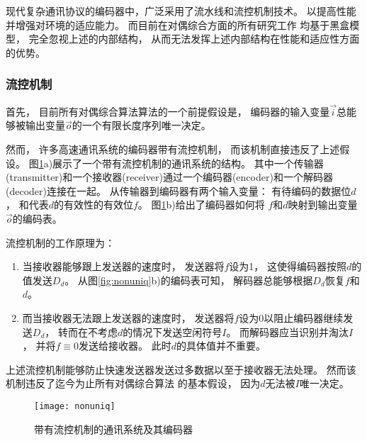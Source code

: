 
现代复杂通讯协议的编码器中，广泛采用了流水线和流控机制技术。
以提高性能并增强对环境的适应能力。
而目前在对偶综合方面的所有研究工作
均基于黑盒模型，
完全忽视上述的内部结构，
从而无法发挥上述内部结构在性能和适应性方面的优势。

\subsubsection{流控机制}
首先，
目前所有对偶综合算法算法的一个前提假设是，
编码器的输入变量$\vec{i}$总能够被输出变量$\vec{o}$的一个有限长度序列唯一决定。

然而，
许多高速通讯系统的编码器带有流控机制，
而该机制直接违反了上述假设。
图\ref{fig_nonuniq_chap1}a)展示了一个带有流控机制的通讯系统的结构。
其中一个传输器(transmitter)和一个接收器(receiver)通过一个编码器(encoder)和一个解码器(decoder)连接在一起。
从传输器到编码器有两个输入变量：
有待编码的数据位$d$，
和代表$d$的有效性的有效位$f$。
图\ref{fig_nonuniq_chap1}b)给出了编码器如何将
$f$和$d$映射到输出变量$\vec{o}$的编码表。

流控机制的工作原理为：
\begin{enumerate}
\item
当接收器能够跟上发送器的速度时，
发送器将$f$设为1，
这使得编码器按照$d$的值发送$D_d$。
从图\ref{fig:nonuniq}b)的编码表可知，
解码器总能够根据$D_d$恢复$f$和$d$。
\item
而当接收器无法跟上发送器的速度时，
发送器将$f$设为0以阻止编码器继续发送$D_d$，
转而在不考虑$d$的情况下发送空闲符号$I$。
而解码器应当识别并淘汰$I$，
并将$f\equiv 0$发送给接收器。
此时$d$的具体值并不重要。
\end{enumerate}

上述流控机制能够防止快速发送器发送过多数据以至于接收器无法处理。
然而该机制违反了迄今为止所有对偶综合算法
的基本假设，
因为$d$无法被$I$唯一决定。


\begin{figure}
\centerline{\texttt{[image: nonuniq]}}
\caption{带有流控机制的通讯系统及其编码器}
\label{fig_nonuniq_chap1}
\end{figure}

